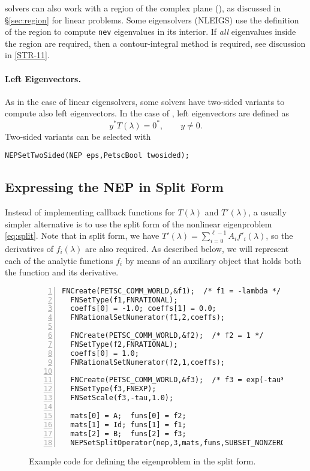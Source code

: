  solvers can also work with a region of the complex plane (), as discussed in \S\ref{sec:region} for linear problems. Some eigensolvers (NLEIGS) use the definition of the region to compute \texttt{nev} eigenvalues in its interior. If \emph{all} eigenvalues inside the region are required, then a contour-integral method is required, see discussion in \hyperlink{str}{[STR-11]}.

\paragraph{Left Eigenvectors.}

As in the case of linear eigensolvers, some  solvers have two-sided variants to compute also left eigenvectors. In the case of , left eigenvectors are defined as
\begin{equation}
y^*T(\lambda)=0^*,\qquad y\neq 0.\label{eq:nepleft}
\end{equation}
Two-sided variants can be selected with
	\begin{Verbatim}[fontsize=\small]
	NEPSetTwoSided(NEP eps,PetscBool twosided);
	\end{Verbatim}

\subsection{\label{sec:nepsplit}Expressing the NEP in Split Form}

Instead of implementing callback functions for $T(\lambda)$ and $T'(\lambda)$, a usually simpler alternative is to use the split form of the nonlinear eigenproblem \eqref{eq:split}. Note that in split form, we have $T'(\lambda)=\sum_{i=0}^{\ell-1}A_if'_i(\lambda)$, so the derivatives of $f_i(\lambda)$ are also required. As described below, we will represent each of the analytic functions $f_i$ by means of an auxiliary object  that holds both the function and its derivative.

\begin{figure}
\begin{Verbatim}[fontsize=\small,numbers=left,numbersep=6pt,xleftmargin=15mm]
  FNCreate(PETSC_COMM_WORLD,&f1);  /* f1 = -lambda */
  FNSetType(f1,FNRATIONAL);
  coeffs[0] = -1.0; coeffs[1] = 0.0;
  FNRationalSetNumerator(f1,2,coeffs);

  FNCreate(PETSC_COMM_WORLD,&f2);  /* f2 = 1 */
  FNSetType(f2,FNRATIONAL);
  coeffs[0] = 1.0;
  FNRationalSetNumerator(f2,1,coeffs);

  FNCreate(PETSC_COMM_WORLD,&f3);  /* f3 = exp(-tau*lambda) */
  FNSetType(f3,FNEXP);
  FNSetScale(f3,-tau,1.0);

  mats[0] = A;  funs[0] = f2;
  mats[1] = Id; funs[1] = f1;
  mats[2] = B;  funs[2] = f3;
  NEPSetSplitOperator(nep,3,mats,funs,SUBSET_NONZERO_PATTERN);
\end{Verbatim}
\caption{\label{fig:ex-split}Example code for defining the  eigenproblem in the split form.}
\end{figure}

